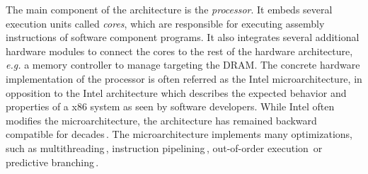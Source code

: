 The main component of the architecture is the \emph{processor}.
%
It embeds several execution units called \emph{cores}, which are
responsible for executing assembly instructions of software component programs.
%
It also integrates several additional hardware modules to connect the cores to
the rest of the hardware architecture, \emph{e.g.} a memory controller to manage
\IOs targeting the DRAM.
%
The concrete hardware implementation of the processor is often referred as the
Intel microarchitecture, in opposition to the Intel architecture which describes
the expected behavior and properties of a x86 system as seen by software
developers.
%
While Intel often modifies the microarchitecture, the architecture has remained
backward compatible for decades\,\cite{turley2014introx86}.
%
The microarchitecture implements many optimizations, such as
multithreading\,\cite{marr2002hypertheading}, instruction
pipelining\,\cite{fog2012microarchitecture}, out-of-order
execution\,\cite[Section 2]{fog2012microarchitecture} or predictive
branching\,\cite{milenkovic2002branchprediction}\cite[Section
3]{fog2012microarchitecture}.
%
%
